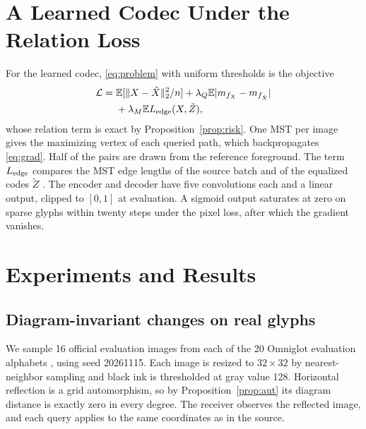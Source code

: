 \documentclass[10pt,conference]{IEEEtran}
\newcommand{\E}{\mathbb E}
\begin{document}
\section{A Learned Codec Under the Relation Loss}\label{sec:train}
For the learned codec, \eqref{eq:problem} with uniform thresholds is the objective
\begin{align}
 \mathcal L={}&\E[\|X-\hat X\|_2^2/n]
 +\lambda_Q\E|m_{f_X}-m_{f_{\hat X}}|\nonumber\\
 &+\lambda_M\E L_{\rm edge}(X,\tilde Z),
 \label{eq:training}
\end{align}
whose relation term is exact by Proposition~\ref{prop:risk}. One MST per image gives the maximizing vertex of each queried path, which backpropagates \eqref{eq:grad}. Half of the pairs are drawn from the reference foreground. The term $L_{\rm edge}$ compares the MST edge lengths of the source batch and of the equalized codes $\tilde Z$ \cite{moor2020topological}. The encoder and decoder have five convolutions each and a linear output, clipped to $[0,1]$ at evaluation. A sigmoid output saturates at zero on sparse glyphs within twenty steps under the pixel loss, after which the gradient vanishes.

\section{Experiments and Results}
\subsection{Diagram-invariant changes on real glyphs}
We sample 16 official evaluation images from each of the 20 Omniglot evaluation alphabets \cite{lake2015omniglot}, using seed 20261115. Each image is resized to $32\times32$ by nearest-neighbor sampling and black ink is thresholded at gray value 128. Horizontal reflection is a grid automorphism, so by Proposition~\ref{prop:aut} its diagram distance is exactly zero in every degree. The receiver observes the reflected image, and each query applies to the same coordinates as in the source.
\end{document}
